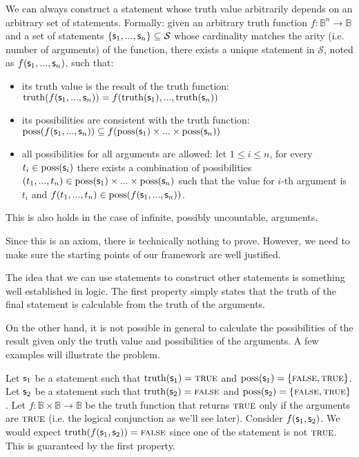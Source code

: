 \documentclass[11pt,letterpaper,fleqn]{memoir} %
\begin{document}
\begin{mathSection}
	\begin{axiom}\label{def_functions_of_statement}
		We can always construct a statement whose truth value arbitrarily depends on an arbitrary set of statements. Formally: given an arbitrary truth function $f : \mathbb{B}^n \to \mathbb{B}$ and a set of statements $\{\mathsf{s}_1, ..., \mathsf{s}_n\} \subseteq \mathcal{S}$  whose cardinality matches the arity (i.e. number of arguments) of the function, there exists a unique statement in $\mathcal{S}$, noted as $f(\mathsf{s}_1, ..., \mathsf{s}_n)$, such that:
		\begin{itemize}
			\item its truth value is the result of the truth function: \newline $\operatorname{truth}(f(\mathsf{s}_1, ..., \mathsf{s}_n)) = f(\operatorname{truth}(\mathsf{s}_1), ..., \operatorname{truth}(\mathsf{s}_n))$
			\item its possibilities are consistent with the truth function: \newline $\operatorname{poss}(f(\mathsf{s}_1, ..., \mathsf{s}_n)) \subseteq f(\operatorname{poss}(\mathsf{s}_1) \times ... \times \operatorname{poss}(\mathsf{s}_n))$
			\item all possibilities for all arguments are allowed:
			\newline let $1 \leq i \leq n$, for every $t_i \in \operatorname{poss}(\mathsf{s}_i)$ there exists a combination of possibilities $(t_1, ..., t_n) \in \operatorname{poss}(\mathsf{s}_1) \times ... \times \operatorname{poss}(\mathsf{s}_n)$ such that the value for $i$-th argument is $t_i$ and  $f(t_1, ..., t_n) \in \operatorname{poss}(f(\mathsf{s}_1, ..., \mathsf{s}_n))$.
		\end{itemize}
	This is also holds in the case of infinite, possibly uncountable, arguments.
	\end{axiom}
	\begin{justification}
		Since this is an axiom, there is technically nothing to prove. However, we need to make sure the starting points of our framework are well justified.
		
		The idea that we can use statements to construct other statements is something well established in logic. The first property simply states that the truth of the final statement is calculable from the truth of the arguments.
		
		On the other hand, it is not possible in general to calculate the possibilities of the result given only the truth value and possibilities of the arguments. A few examples will illustrate the problem.
		
		Let $\mathsf{s}_1$ be a statement such that $\operatorname{truth}(\mathsf{s}_1) = \textsc{true}$ and $\operatorname{poss}(\mathsf{s}_1) = \{\textsc{false}, \textsc{true}\}$. Let $\mathsf{s}_2$ be a statement such that $\operatorname{truth}(\mathsf{s}_2) = \textsc{false}$ and $\operatorname{poss}(\mathsf{s}_2) = \{\textsc{false}, \textsc{true}\}$. Let $f : \mathbb{B} \times \mathbb{B} \to \mathbb{B}$ be the truth function that returns $\textsc{true}$ only if the arguments are $\textsc{true}$ (i.e. the logical conjunction as we'll see later). Consider $f(\mathsf{s}_1, \mathsf{s}_2)$. We would expect $\operatorname{truth}(f(\mathsf{s}_1, \mathsf{s}_2)) = \textsc{false}$ since one of the statement is not $\textsc{true}$. This is guaranteed by the first property.
		

\end{justification}
\end{mathSection}
\end{document}
